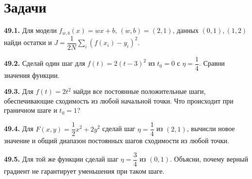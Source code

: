 \section*{Задачи}
\begingroup\setlength{\parskip}{2pt}
\noindent\begin{minipage}[t]{\linewidth}\textbf{49.1.} Для модели \(f_{w,b}(x)=wx+b\), \((w,b)=(2,1)\), данных \((0,1),(1,2)\) найди остатки и \(J=\dfrac1{2N}\sum_i(f(x_i)-y_i)^2\).\par\end{minipage}\par
\noindent\begin{minipage}[t]{\linewidth}\textbf{49.2.} Сделай один шаг для \(f(t)=2(t-3)^2\) из \(t_0=0\) с \(\eta=\dfrac14\). Сравни значения функции.\par\end{minipage}\par
\noindent\begin{minipage}[t]{\linewidth}\textbf{49.3.}\starmark{} Для \(f(t)=2t^2\) найди все постоянные положительные шаги, обеспечивающие сходимость из любой начальной точки. Что происходит при граничном шаге и \(t_0=1\)?\par\end{minipage}\par
\noindent\begin{minipage}[t]{\linewidth}\textbf{49.4.} Для \(F(x,y)=\dfrac12x^2+2y^2\) сделай шаг \(\eta=\dfrac14\) из \((2,1)\), вычисли новое значение и общий диапазон постоянных шагов сходимости из любой точки.\par\end{minipage}\par
\noindent\begin{minipage}[t]{\linewidth}\textbf{49.5.} Для той же функции сделай шаг \(\eta=\dfrac34\) из \((0,1)\). Объясни, почему верный градиент не гарантирует уменьшения при таком шаге.\par\end{minipage}\par
